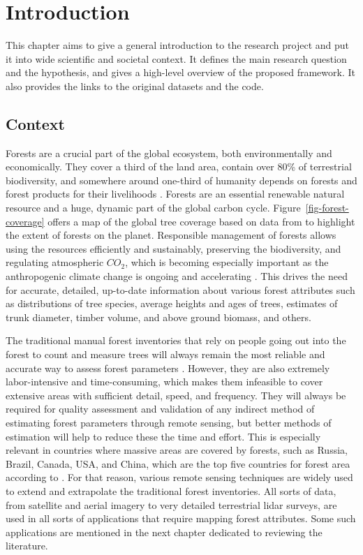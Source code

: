 \chapter{Introduction}\label{cap:introduction}

This chapter aims to give a general introduction to the research project and put it into wide scientific and societal context.
It defines the main research question and the hypothesis, and gives a high-level overview of the proposed framework.
It also provides the links to the original datasets and the code.

\section{Context}
Forests are a crucial part of the global ecosystem, both environmentally and economically.
They cover a third of the land area, contain over 80\% of terrestrial biodiversity, and somewhere around one-third of humanity depends on forests and forest products for their livelihoods \citep{aertsForestRestorationBiodiversity2011,StateWorldsForests2020}.
Forests are an essential renewable natural resource and a huge, dynamic part of the global carbon cycle.
Figure~\ref{fig-forest-coverage} offers a map of the global tree coverage based on data from \citet{hansenHighResolutionGlobalMaps2013} to highlight the extent of forests on the planet.
Responsible management of forests allows using the resources efficiently and sustainably, preserving the biodiversity, and regulating atmospheric $CO_2$, which is becoming especially important as the anthropogenic climate change is ongoing and accelerating \citep{faheyForestCarbonStorage2010,forsterIndicatorsGlobalClimate2024}.
This drives the need for accurate, detailed, up-to-date information about various forest attributes such as distributions of tree species, average heights and ages of trees, estimates of trunk diameter, timber volume, and above ground biomass, and others.

The traditional manual forest inventories that rely on people going out into the forest to count and measure trees will always remain the most reliable and accurate way to assess forest parameters \citep{burleyEncyclopediaForestSciences2004}.
However, they are also extremely labor-intensive and time-consuming, which makes them infeasible to cover extensive areas with sufficient detail, speed, and frequency.
They will always be required for quality assessment and validation of any indirect method of estimating forest parameters through remote sensing, but better methods of estimation will help to reduce these the time and effort.
This is especially relevant in countries where massive areas are covered by forests, such as Russia, Brazil, Canada, USA, and China, which are the top five countries for forest area according to \citet{GlobalForestResources2020}.
For that reason, various remote sensing techniques are widely used to extend and extrapolate the traditional forest inventories.
All sorts of data, from satellite and aerial imagery to very detailed terrestrial \gls{lidar} surveys, are used in all sorts of applications that require mapping forest attributes.
Some such applications are mentioned in the next chapter dedicated to reviewing the literature.


